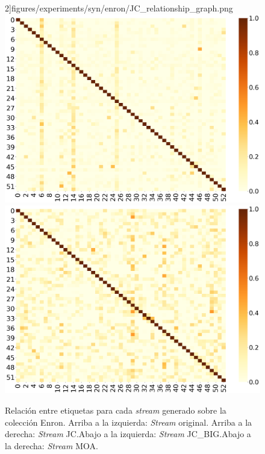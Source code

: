 \begin{figure}[htbp]
		2]{figures/experiments/syn/enron/JC_relationship_graph.png}
	\includegraphics[width=\linewidth /
		2]{figures/experiments/syn/enron/JC_BIG_relationship_graph.png}
	\includegraphics[width=\linewidth /
		2]{figures/experiments/syn/enron/MOA_relationship_graph.png}
	\caption[Relación entre etiquetas para cada \textit{stream} generado sobre
		la colección Enron.]{Relación entre etiquetas para cada \textit{stream} generado sobre
		la colección Enron. Arriba a la izquierda: \textit{Stream} original. Arriba a la
		derecha: \textit{Stream} JC.\@ Abajo a la izquierda: \textit{Stream}
		JC\_BIG.\@ Abajo a la derecha: \textit{Stream} MOA.}
	\label{fig:syn_enron_label_relationship}
\end{figure}

